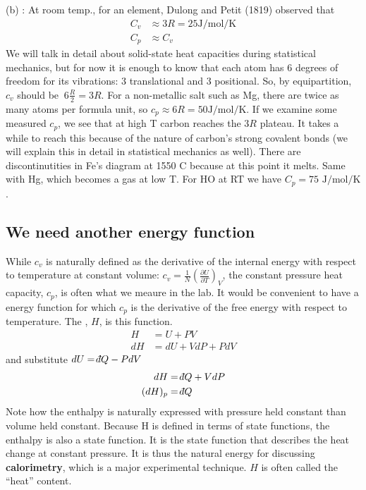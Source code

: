 \documentclass[12pt]{article}
\def\dbar{{\mathchar'26\mkern-12mu d}}
\begin{document}
(b) : At room temp., for an element, Dulong and Petit (1819) observed that
\begin{align*}
C_v &\approx 3 R = 25 \text{J}/\text{mol}/\text{K}\\
C_p & \approx C_v
\end{align*}
We will talk in detail about solid-state heat capacities during statistical mechanics, but for now it is enough to know that each atom has 6 degrees of freedom for its vibrations: 3 translational and 3 positional. So, by equipartition, $c_v$ should be $~6 \frac{R}{2}=3R$. For a non-metallic salt such as Mg, there are twice as many atoms per formula unit, so $c_p \approx 6 R = 50\text{J}/\text{mol}/\text{K}$.   If we examine some measured  $c_p$, we see that at high T carbon reaches the $3R$ plateau.  It takes a while to reach this because of the nature of carbon's strong covalent bonds (we will explain this in detail in statistical mechanics as well).  There are discontinutities in Fe's diagram at 1550 \degree C because at this point it melts.  Same with Hg, which becomes a gas at low T.  For H\2O at RT we have $C_p = 75 \text{ J}/\text{mol}/\text{K}$.

\subsection{We need another energy function}
While $c_v$ is naturally defined as the derivative of the internal energy with respect to temperature at constant volume: $c_v = \frac{1}{N} \left(\frac{\partial U}{\partial T}\right)_V$, the constant pressure heat capacity, $c_p$, is often what we meaure in the lab. It would be convenient to have a energy function for which $c_p$ is the derivative of the free energy with respect to temperature. The , $H$, is this function.
\begin{align*}
H &= U + PV\\
dH &= dU + V dP + P dV
\end{align*}
and substitute $dU = \dbar Q - P dV$
\begin{align*}
dH &= \dbar Q + V dP\\
(dH)_p &= \dbar Q
\end{align*}
Note how the enthalpy is naturally expressed with pressure held constant than volume held constant. Because H is defined in terms of state functions, the enthalpy is also a state function. It is the state function that describes the heat change at constant pressure.  It is thus the natural energy for discussing \textbf{calorimetry}, which is a major experimental technique.  $H$ is often called the ``heat'' content.\\
\end{document}
